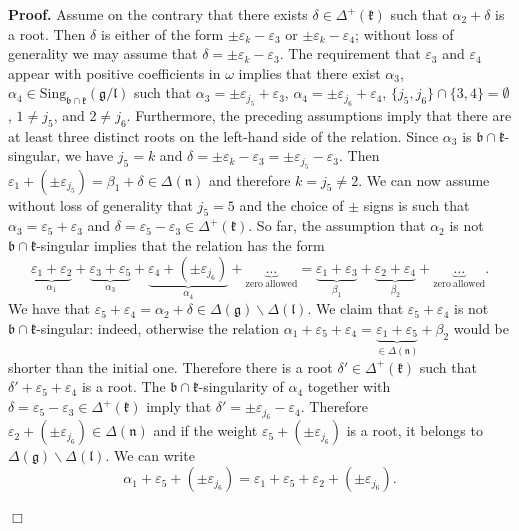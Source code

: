 \documentclass[12pt]{report}
\newenvironment{proof}[1][]{ \textbf{Proof#1. }}{$\Box$\medskip}
\newcommand{\kk}{\mathfrak{k}}
\newcommand{\nn}{\mathfrak{n}}
\newcommand{\gG}{\mathfrak{g}}
\newcommand{\bb}{\mathfrak{b}}
\newcommand{\lL}{\mathfrak{l}}
\newcommand{\hw}{\mathrm{Sing}}
\newcommand{\eps}{\varepsilon}
\newcommand{\pmf}[1]{ \pm}%
\begin{document}
\begin{proof}
Assume on the contrary that there exists $\delta\in\Delta^+(\kk)$ such that $\alpha_2+\delta$ is a root. Then $\delta$ is either of the form $\pmf{k}\eps_{k}-\eps_{3}$ or $\pmf{k}\eps_{k}-\eps_{4}$; without loss of generality we may assume that $\delta=\pmf{k}\eps_{k}-\eps_{3}$. The requirement that $\eps_{3}$ and $\eps_{4}$ appear with positive coefficients in $\omega$ implies that there exist $\alpha_3$, $\alpha_4 \in\hw_{\bb\cap\kk}(\gG/\lL)$ such that $\alpha_3=\pmf{j_5}\eps_{j_5} +\eps_{3}$, $\alpha_4= \pmf{j_6} \eps_{j_6}+\eps_{4}$, $\{j_5,j_6\} \cap\{3,4\} = \emptyset$, $1\neq j_5$, and $2\neq j_6$. Furthermore, the preceding assumptions imply that there are at least three distinct roots on the left-hand side of the relation. Since $\alpha_3$ is $\bb\cap\kk$-singular, we have $j_5=k$ and $\delta= \pmf{k} \eps_{k} -\eps_{3} =  \pmf{j_5} \eps_{j_5}-\eps_{ 3}$. Then $\eps_{1}+ (\pmf{j_5} \eps_{j_5}) = \beta_1 + \delta \in \Delta(\nn)$ and therefore $k=j_5\neq 2$. We can now assume without loss of generality that ${j_5}=5$ and the choice of $\pm$ signs is such that $\alpha_3=\eps_5+\eps_3$ and $\delta=\eps_5-\eps_3\in\Delta^+(\kk)$. So far, the assumption that $\alpha_2$ is not $\bb\cap\kk$-singular implies that the relation has the form
\[
\underbrace{\eps_{1}+\eps_{2}}_{\alpha_1}+\underbrace{\eps_{3}+\eps_{5}}_{\alpha_3} +\underbrace{ \eps_{4}+ (\pmf{j_6} \eps_{j_6})}_{\alpha_4} +\underbrace{\dots}_{\mathrm{zero~allowed}} = \underbrace{\eps_{1} + \eps_{3} }_{\beta_1}+\underbrace{ \eps_{2} +\eps_{4}}_{\beta_2}+\underbrace{\dots}_{\mathrm{zero~allowed}}.
\]
We have that $\eps_{5} +\eps_{4}=\alpha_2+\delta\in\Delta(\gG)\backslash\Delta(\lL)$. We claim that $\eps_{5} +\eps_{4}$ is not $\bb\cap\kk$-singular: indeed, otherwise the relation $\alpha_1+\eps_{5} +\eps_{4}= \underbrace{\eps_{1} +\eps_{5}}_{\in\Delta(\nn)} +\beta_2$ would be shorter than the initial one. Therefore there is a root $\delta'\in \Delta^+(\kk)$ such that $\delta'+\eps_{5} +\eps_{4}$ is a root. The $\bb\cap\kk$-singularity of $\alpha_4$ together with $\delta=\eps_5-\eps_3\in\Delta^+(\kk)$ imply that $\delta' = \pmf{j_6}\eps_{j_6}-\eps_{4}$. Therefore $\eps_{2}+(\pmf{j_6} \eps_{j_6}) \in \Delta(\nn)$ and if the weight $\eps_{5}+ (\pmf{j_6}\eps_{j_6})$ is a root, it belongs to $\Delta(\gG) \backslash\Delta(\lL)$. We can write 
\begin{equation}\label{eqTempso(2n)} 
\alpha_1+\eps_{5}+(\pmf{j_6}\eps_{j_6})=\eps_{1}+\eps_{5} + \eps_{2}+ (\pmf{j_6} \eps_{j_6}). 
\end{equation} 

\end{proof}
\end{document}
